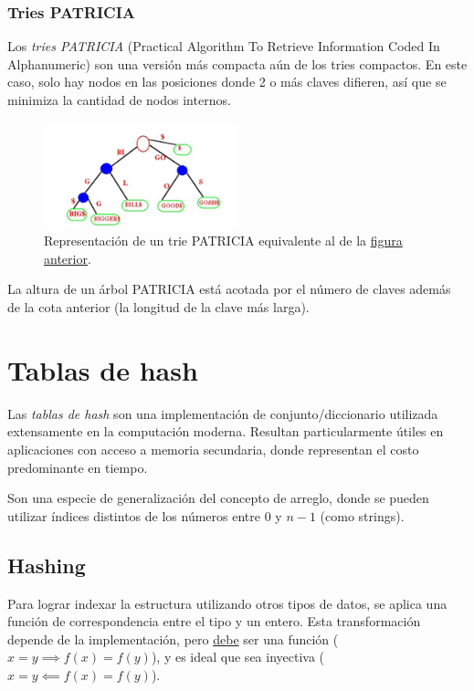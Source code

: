 \documentclass{article}
\begin{document}
    \subsubsection{Tries PATRICIA}

    Los \textit{tries PATRICIA} (Practical Algorithm To Retrieve Information Coded In
    Alphanumeric) son una versión más compacta aún de los tries compactos. En este caso, solo hay nodos en las posiciones donde 2 o más claves difieren, así que se minimiza la cantidad de nodos internos.

    \begin{figure}[H]
        \centering
        \includegraphics[width=0.5\textwidth]{trie_patricia.png}
        \caption*{Representación de un trie PATRICIA equivalente al de la \hyperref[fig-trie]{figura anterior}.}
    \end{figure}

    La altura de un árbol PATRICIA está acotada por el número de claves además de la cota anterior (la longitud de la clave más larga).

    \section{Tablas de hash}
    \label{sec-hash-tables}

    Las \textit{tablas de hash} son una implementación de conjunto/diccionario utilizada extensamente en la computación moderna. Resultan particularmente útiles en aplicaciones con acceso a memoria secundaria, donde representan el costo predominante en tiempo.

    Son una especie de generalización del concepto de arreglo, donde se pueden utilizar índices distintos de los números entre $0$ y $n-1$ (como strings).

    \subsection{Hashing}

    Para lograr indexar la estructura utilizando otros tipos de datos, se aplica una función de correspondencia entre el tipo y un entero. Esta transformación depende de la implementación, pero \underline{debe} ser una función ($x = y \implies f(x) = f(y)$), y es ideal que sea inyectiva ($x = y \impliedby f(x) = f(y)$).
\end{document}
